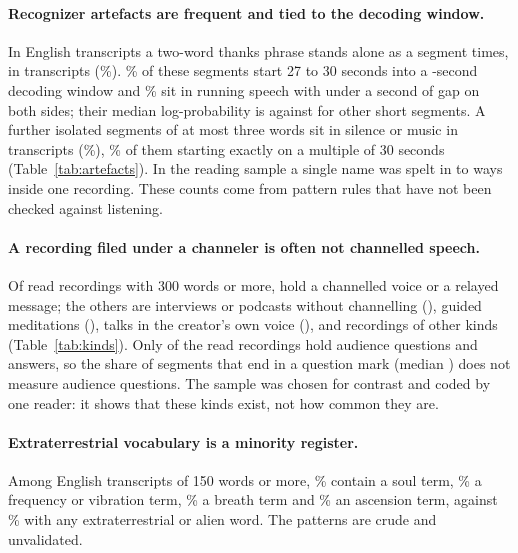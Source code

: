 \paragraph{Recognizer artefacts are frequent and tied to the decoding window.}
In \ArtEnglishBase{} English transcripts a two-word thanks phrase stands alone as a segment \ThanksSegments{} times, in \ThanksTranscripts{} transcripts (\ThanksPct\%). \ThanksLateWindowPct\% of these segments start 27 to 30 seconds into a \WindowSeconds-second decoding window and \ThanksEmbeddedPct\% sit in running speech with under a second of gap on both sides; their median log-probability is \ThanksLogp{} against \OtherShortLogp{} for other short segments. A further \IsoSegments{} isolated segments of at most three words sit in silence or music in \IsoTranscripts{} transcripts (\IsoPct\%), \IsoGridPct\% of them starting exactly on a multiple of 30 seconds (Table~\ref{tab:artefacts}). In the reading sample a single name was spelt in \SpellingsMin{} to \SpellingsMax{} ways inside one recording. These counts come from pattern rules that have not been checked against listening.

\paragraph{A recording filed under a channeler is often not channelled speech.}
Of \ReadLongN{} read recordings with 300 words or more, \KindChannelled{} hold a channelled voice or a relayed message; the others are interviews or podcasts without channelling (\KindInterview), guided meditations (\KindMeditation), talks in the creator's own voice (\KindOwnVoice), and \KindOther{} recordings of other kinds (Table~\ref{tab:kinds}). Only \ReadAudienceQA{} of the \ReadN{} read recordings hold audience questions and answers, so the share of segments that end in a question mark (median \QuestMed) does not measure audience questions. The sample was chosen for contrast and coded by one reader: it shows that these kinds exist, not how common they are.

\paragraph{Extraterrestrial vocabulary is a minority register.}
Among \TermBase{} English transcripts of 150 words or more, \TermSoul\% contain a soul term, \TermFrequency\% a frequency or vibration term, \TermBreath\% a breath term and \TermAscension\% an ascension term, against \TermExtraterrestrial\% with any extraterrestrial or alien word. The patterns are crude and unvalidated.

